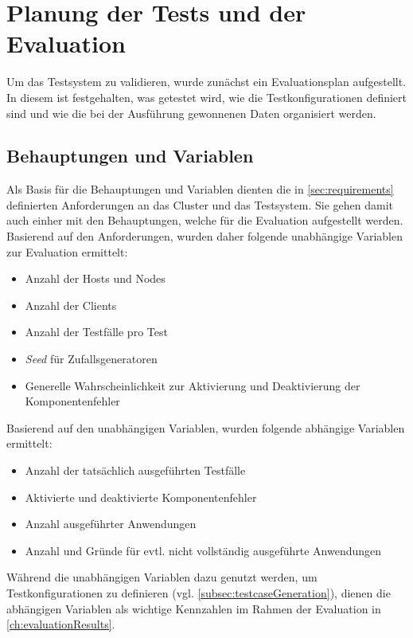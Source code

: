 \section{Planung der Tests und der Evaluation}
\label{sec:evaluationPlan}

Um das Testsystem zu validieren, wurde zunächst ein Evaluationsplan aufgestellt.
In diesem ist festgehalten, was getestet wird, wie die Testkonfigurationen definiert sind und wie die bei der Ausführung gewonnenen Daten organisiert werden.

\subsection{Behauptungen und Variablen}
\label{subsec:theses}

Als Basis für die Behauptungen und Variablen dienten die in \cref{sec:requirements} definierten Anforderungen an das Cluster und das Testsystem.
Sie gehen damit auch einher mit den Behauptungen, welche für die Evaluation aufgestellt werden.
Basierend auf den Anforderungen, wurden daher folgende unabhängige Variablen zur Evaluation ermittelt:

\begin{itemize}
    \item Anzahl der Hosts und Nodes
    \item Anzahl der Clients
    \item Anzahl der Testfälle pro Test
    \item \emph{Seed} für Zufallsgeneratoren
    \item Generelle Wahrscheinlichkeit zur Aktivierung und Deaktivierung der Komponentenfehler
\end{itemize}

Basierend auf den unabhängigen Variablen, wurden \uA folgende abhängige Variablen ermittelt:

\begin{itemize}
    \item Anzahl der tatsächlich ausgeführten Testfälle
    \item Aktivierte und deaktivierte Komponentenfehler
    \item Anzahl ausgeführter Anwendungen
    \item Anzahl und Gründe für evtl. nicht vollständig ausgeführte Anwendungen
\end{itemize}

Während die unabhängigen Variablen dazu genutzt werden, um Testkonfigurationen zu definieren (vgl. \cref{subsec:testcaseGeneration}), dienen die abhängigen Variablen als wichtige Kennzahlen im Rahmen der Evaluation in \cref{ch:evaluationResults}.

